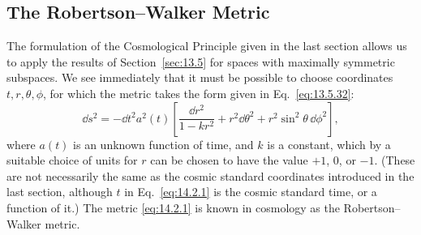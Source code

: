 %

\subsection{The Robertson--Walker Metric}\label{sec:14.2}

The formulation of the Cosmological Principle given in the last section
allows us to apply the results of Section~\ref{sec:13.5} for spaces with
maximally symmetric subspaces. We see immediately that it must be possible to
choose coordinates \(t,r,\theta,\phi\), for which the metric takes the form
given in Eq.~\eqref{eq:13.5.32}:
\begin{equation}
  \dd s^2
  =
  -\dd t^2
  a^2(t)
  \left[
    \frac{\dd r^2}{1-kr^2}
    +r^2\dd\theta^2
    +r^2\sin^2\theta\,\dd\phi^2
  \right],
  \tag{14.2.1}\label{eq:14.2.1}
\end{equation}
where \(a(t)\) is an unknown function of time, and \(k\) is a constant, which
by a suitable choice of units for \(r\) can be chosen to have the value
\(+1\), \(0\), or \(-1\). (These are not necessarily the same as the cosmic
standard coordinates introduced in the last section, although \(t\) in
Eq.~\eqref{eq:14.2.1} is the cosmic standard time, or a function of it.) The
metric \eqref{eq:14.2.1} is known in cosmology as the Robertson--Walker
metric.

